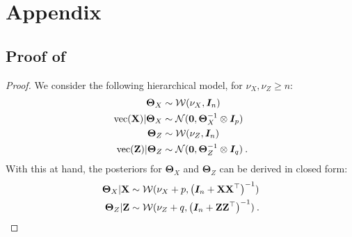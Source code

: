 
\section{Appendix}

\subsection{Proof of }

\PCAgraphcoupling*

\begin{proof}
We consider the following hierarchical model, for $\nu_{X}, \nu_{Z} \geq n$:
\begin{align*}
    \bm{\Theta}_{X} &\sim  \mathcal{W}(\nu_{X}, \bm{I}_n) \\
    \mathrm{vec}(\mathbf{X}) | \bm{\Theta}_{X} &\sim \mathcal{N}(\bm{0}, \bm{\Theta}_{X}^{-1} \otimes \bm{I}_p) \\
    \bm{\Theta}_{Z} &\sim  \mathcal{W}(\nu_{Z}, \bm{I}_n) \\
    \mathrm{vec}(\mathbf{Z}) | \bm{\Theta}_{Z} &\sim \mathcal{N}(\bm{0}, \bm{\Theta}_{Z}^{-1} \otimes \bm{I}_q) \:.
\end{align*}
With this at hand, the posteriors for $\bm{\Theta}_X$ and $\bm{\Theta}_Z$ can be derived in closed form: 
\begin{align*}
    \bm{\Theta}_{X} | \mathbf{X} &\sim  \mathcal{W}(\nu_{X}+p, \left(\bm{I}_n + \mathbf{X} \mathbf{X}^\top\right)^{-1}) \\
    \bm{\Theta}_{Z} | \mathbf{Z} &\sim  \mathcal{W}(\nu_{Z} + q, \left(\bm{I}_n + \mathbf{Z} \mathbf{Z}^\top\right)^{-1}) \:.
\end{align*}


\end{proof}

